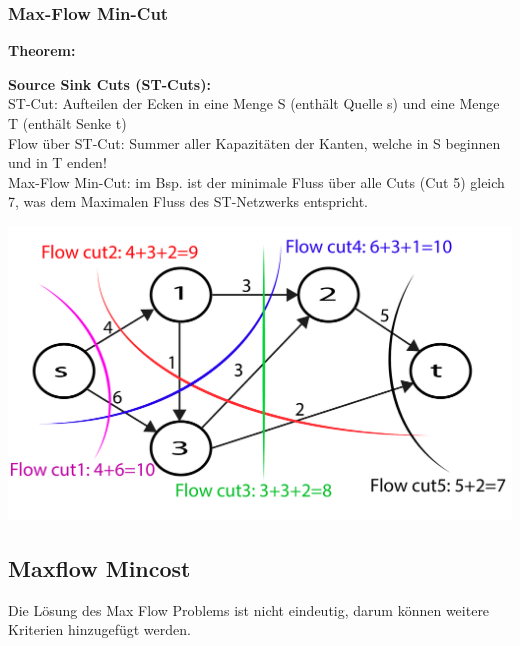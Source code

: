 \subsubsection{Max-Flow Min-Cut}
\textbf{Theorem:} 

\begin{minipage}{0.6\textwidth}
	\textbf{Source Sink Cuts (ST-Cuts):}\\
	
	ST-Cut: Aufteilen der Ecken in eine Menge S (enthält Quelle s) und eine Menge T (enthält Senke t)\\
	
	Flow über ST-Cut: Summer aller Kapazitäten der Kanten, welche in S beginnen und in T enden!\\
	
	Max-Flow Min-Cut: im Bsp. ist der minimale Fluss über alle Cuts (Cut 5) gleich 7, was dem Maximalen Fluss des ST-Netzwerks entspricht. 
\end{minipage}
\begin{minipage}{0.4\textwidth}
	\includegraphics[width=\textwidth]{Content/Graphen/StCuts.pdf}
\end{minipage}

\subsection{Maxflow Mincost}
Die Lösung des Max Flow Problems ist nicht eindeutig, darum können weitere Kriterien hinzugefügt werden.

